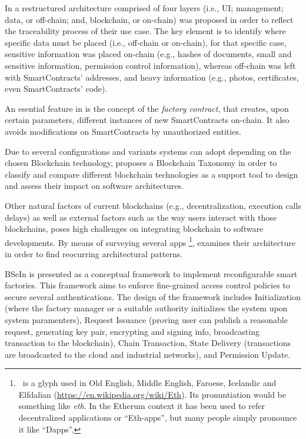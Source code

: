 \documentclass[runningheads]{llncs}
\begin{document}
In \cite{Xu2019} a restructured architecture comprised of four layers (i.e., UI; management; data, or off-chain; and, blockchain, or on-chain) was proposed in order to reflect the traceability process of their use case. The key element is to identify where specific data must be placed (i.e., off-chain or on-chain), for that specific case, sensitive information was placed on-chain (e.g., hashes of documents, small and sensitive information, permission control information), whereas off-chain was left with SmartContracts' addresses, and heavy information (e.g., photos, certificates, even SmartContracts' code).

An esential feature in \cite{Xu2019} is the concept of the \emph{factory contract}, that creates, upon certain parameters, different instances of new SmartContracts on-chain. It also avoids modifications on SmartContracts by unauthorized entities.

Due to several configurations and variants systems can adopt depending on the chosen Blockchain technology, \cite{Xu2017} proposes a Blockchain Taxonomy in order to classify and compare different blockchain technologies as a support tool to design and assess their impact on software architectures.

Other natural factors of current blockchains (e.g., decentralization, execution calls delays) as well as external factors such as the way users interact with those blockchains, poses high challenges on integrating blockchain to software developments. By means of surveying several \DH apps \footnote{\DH\ is a glyph used in Old English, Middle English, Faroese, Icelandic and Elfdalian (\url{https://en.wikipedia.org/wiki/Eth}). Its pronuntiation would be something like \emph{eth}. In the Etherum context it has been used to refer decentralized applications or ``Eth-apps'', but many people simply pronounce it like ``Dapps''.}, \cite{Wessling2018} examines their architecture in order to find reocurring architectural patterns.

BSeIn is presented as a conceptual framework \cite{Lin2018} to implement reconfigurable smart factories. This framework aims to enforce fine-grained access control policies to secure several authentications. The design of the framework includes Initialization (where the factory manager or a suitable authority initializes the system upon system paramenters), Request Issuance (proving user can publish a reasonable request, generating key pair, encrypting and signing info, broadcasting transaction to the blockchain), Chain Transaction, State Delivery (transactions are broadcasted to the cloud and industrial networks), and Permission Update.
\end{document}
